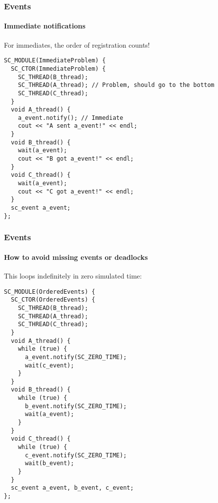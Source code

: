 \begin{frame}[fragile]
\frametitle{Events}
\framesubtitle{Immediate notifications}

\begin{block}{For immediates, the order of registration counts!}
\vspace{-1em}
{\scriptsize 
\begin{verbatim}
SC_MODULE(ImmediateProblem) {
  SC_CTOR(ImmediateProblem) {
    SC_THREAD(B_thread);
    SC_THREAD(A_thread); // Problem, should go to the bottom
    SC_THREAD(C_thread);
  }
  void A_thread() {
    a_event.notify(); // Immediate
    cout << "A sent a_event!" << endl;
  }
  void B_thread() {
    wait(a_event);
    cout << "B got a_event!" << endl;
  }
  void C_thread() {
    wait(a_event);
    cout << "C got a_event!" << endl;
  }
  sc_event a_event;
};
\end{verbatim}
}
\vspace{-1em}
\end{block}
\end{frame}

\begin{frame}[fragile]
\frametitle{Events}
\framesubtitle{How to avoid missing events or deadlocks}

\begin{block}{This loops indefinitely in zero simulated time:}
\vspace{-1em}
{\tiny 
\begin{verbatim}
SC_MODULE(OrderedEvents) {
  SC_CTOR(OrderedEvents) {
    SC_THREAD(B_thread);
    SC_THREAD(A_thread);
    SC_THREAD(C_thread);
  }
  void A_thread() {
    while (true) {
      a_event.notify(SC_ZERO_TIME);
      wait(c_event);
    }
  }
  void B_thread() {
    while (true) {
      b_event.notify(SC_ZERO_TIME);
      wait(a_event);
    }
  }
  void C_thread() {
    while (true) {
      c_event.notify(SC_ZERO_TIME);
      wait(b_event);
    }
  }  
  sc_event a_event, b_event, c_event;
};
\end{verbatim}
}
\vspace{-1em}
\end{block}
\end{frame}

